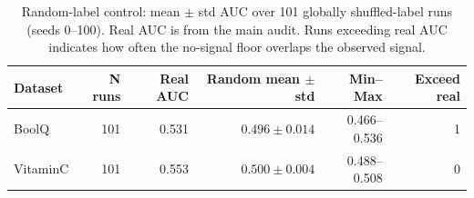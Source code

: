 \begin{table}[t]
\centering
\caption{Random-label control: mean $\pm$ std AUC over 101 globally shuffled-label runs (seeds 0--100). Real AUC is from the main audit. Runs exceeding real AUC indicates how often the no-signal floor overlaps the observed signal.}
\label{tab:random_label_control}
\begin{tabular}{lrrrrr}
\toprule
Dataset & N runs & Real AUC & Random mean $\pm$ std & Min--Max & Exceed real \\
\midrule
BoolQ & 101 & 0.531 & $0.496 \pm 0.014$ & 0.466--0.536 & 1 \\
VitaminC & 101 & 0.553 & $0.500 \pm 0.004$ & 0.488--0.508 & 0 \\
\bottomrule
\end{tabular}
\end{table}
